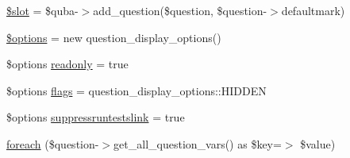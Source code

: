 \begin{DoxyCompactItemize}
\item 
\hyperlink{questiontestedit_8php_a3e6bbab99eb17efe8681b9072bf74a2d}{\$slot} = \$quba-\/$>$add\_\-question(\$question, \$question-\/$>$defaultmark)
\item 
\hyperlink{questiontestedit_8php_a011800c63ece4cbbfa77136a20607023}{\$options} = new question\_\-display\_\-options()
\item 
\$options \hyperlink{questiontestedit_8php_a78c524eb69c50edb232234e0bc6b4de9}{readonly} = true
\item 
\$options \hyperlink{questiontestedit_8php_adcb2a3f70c8c91986e6561111d0d9b0f}{flags} = question\_\-display\_\-options::HIDDEN
\item 
\$options \hyperlink{questiontestedit_8php_a27730100abd83366c35b68c4b9a7b5ec}{suppressruntestslink} = true
\item 
\hyperlink{questiontestedit_8php_a0d074fb374d449e3e0c5e1013668a095}{foreach} (\$question-\/$>$get\_\-all\_\-question\_\-vars() as \$key=$>$ \$value)
\end{DoxyCompactItemize}


